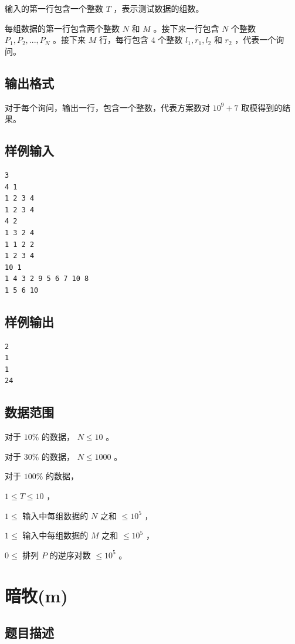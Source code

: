 \documentclass[12pt]{article}
\begin{document}
输入的第一行包含一个整数 $T$ ，表示测试数据的组数。

每组数据的第一行包含两个整数 $N$ 和 $M$ 。接下来一行包含 $N$ 个整数 $P_1,P_2,...,P_N$ 。接下来 $M$ 行，每行包含 $4$ 个整数 $l_1,r_1,l_2$ 和 $r_2$ ，代表一个询问。

\subsection{输出格式}

对于每个询问，输出一行，包含一个整数，代表方案数对 $10^9+7$ 取模得到的结果。

\subsection{样例输入}

\begin{verbatim}
3
4 1
1 2 3 4
1 2 3 4
4 2
1 3 2 4
1 1 2 2
1 2 3 4
10 1
1 4 3 2 9 5 6 7 10 8
1 5 6 10
\end{verbatim}

\subsection{样例输出}

\begin{verbatim}
2
1
1
24
\end{verbatim}

\subsection{数据范围}

对于 $10\%$ 的数据， $N\le 10$ 。

对于 $30\%$ 的数据， $N\le 1000$ 。

对于 $100\%$ 的数据，

$1\le T\le 10$ ，

$1\le$ 输入中每组数据的 $N$ 之和 $\le 10^5$ ，

$1\le$ 输入中每组数据的 $M$ 之和 $\le 10^5$ ，

$0\le$ 排列 $P$ 的逆序对数 $\le 10^5$ 。

\newpage
\section{暗牧(m)}
\subsection{题目描述}
\end{document}
